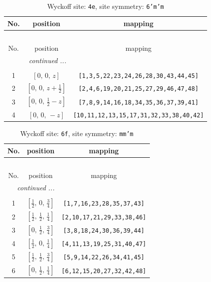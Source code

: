 \documentclass[fleqn,8pt]{jsarticle}
\begin{document}
\renewcommand{\arraystretch}{1.2}
\begin{longtable}{ccc}
\caption{Wyckoff site: {\tt 4e}, site symmetry: {\tt 6'm'm}}
 \\
 \hline \hline
No. & position & mapping \\ \hline \endfirsthead

\multicolumn{2}{l}{\tablename\ \thetable{}} \\
 \hline \hline
No. & position & mapping \\ \hline \endhead

 \hline \hline
\multicolumn{2}{r}{\footnotesize\it continued ...} \\ \endfoot

 \hline \hline
\multicolumn{2}{r}{} \\ \endlastfoot

1 & $\left[ 0,\, 0,\, z \right]$ & {\tt [1,3,5,22,23,24,26,28,30,43,44,45]} \\ \hline
2 & $\left[ 0,\, 0,\, z + \frac{1}{2} \right]$ & {\tt [2,4,6,19,20,21,25,27,29,46,47,48]} \\ \hline
3 & $\left[ 0,\, 0,\, \frac{1}{2} - z \right]$ & {\tt [7,8,9,14,16,18,34,35,36,37,39,41]} \\ \hline
4 & $\left[ 0,\, 0,\, - z \right]$ & {\tt [10,11,12,13,15,17,31,32,33,38,40,42]} \\
\end{longtable}
\renewcommand{\arraystretch}{1.2}
\begin{longtable}{ccc}
\caption{Wyckoff site: {\tt 6f}, site symmetry: {\tt mm'm}}
 \\
 \hline \hline
No. & position & mapping \\ \hline \endfirsthead

\multicolumn{2}{l}{\tablename\ \thetable{}} \\
 \hline \hline
No. & position & mapping \\ \hline \endhead

 \hline \hline
\multicolumn{2}{r}{\footnotesize\it continued ...} \\ \endfoot

 \hline \hline
\multicolumn{2}{r}{} \\ \endlastfoot

1 & $\left[ \frac{1}{2},\, 0,\, \frac{3}{4} \right]$ & {\tt [1,7,16,23,28,35,37,43]} \\ \hline
2 & $\left[ \frac{1}{2},\, \frac{1}{2},\, \frac{1}{4} \right]$ & {\tt [2,10,17,21,29,33,38,46]} \\ \hline
3 & $\left[ 0,\, \frac{1}{2},\, \frac{3}{4} \right]$ & {\tt [3,8,18,24,30,36,39,44]} \\ \hline
4 & $\left[ \frac{1}{2},\, 0,\, \frac{1}{4} \right]$ & {\tt [4,11,13,19,25,31,40,47]} \\ \hline
5 & $\left[ \frac{1}{2},\, \frac{1}{2},\, \frac{3}{4} \right]$ & {\tt [5,9,14,22,26,34,41,45]} \\ \hline
6 & $\left[ 0,\, \frac{1}{2},\, \frac{1}{4} \right]$ & {\tt [6,12,15,20,27,32,42,48]} \\
\end{longtable}
\end{document}
